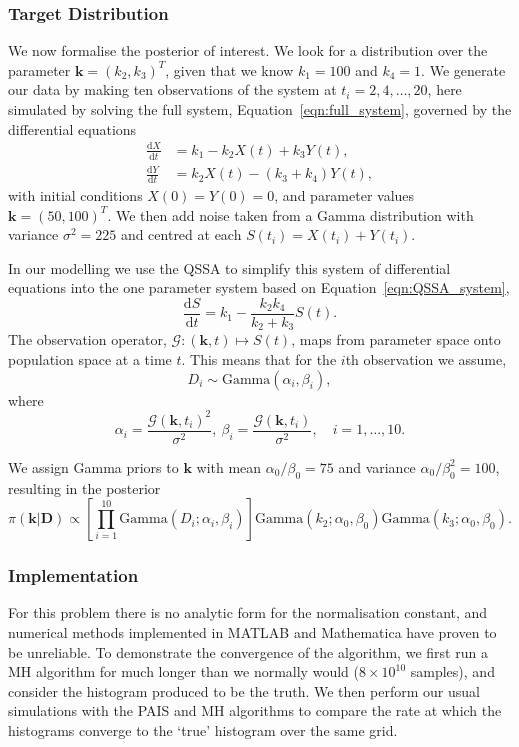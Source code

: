 \documentclass[final]{siamltex}
\begin{document}
\subsubsection{Target Distribution}

We now formalise the posterior of interest. We look for a distribution over the parameter $\mathbf{k} = (k_2, k_3)^T$, given that we know $k_1 = 100$ and $k_4=1$. We generate our data by making ten observations of the system at $t_i = 2, 4, \dots, 20$, here simulated by solving the full system, Equation~\ref{eqn:full_system}, governed by the differential equations
\begin{align*}
	\frac{\text{d}X}{\text{d}t} &= k_1 - k_2X(t)+k_3Y(t), \\
	\frac{\text{d}Y}{\text{d}t} &= k_2X(t) - (k_3+k_4)Y(t),
\end{align*}
with initial conditions $X(0)=Y(0) = 0$, and parameter values $\mathbf{k} = (50, 100)^T$. We then add noise taken from a Gamma distribution with variance $\sigma^2 = 225$ and centred at each $S(t_i)=X(t_i)+Y(t_i)$.

In our modelling we use the QSSA to simplify this system of differential equations into the one parameter system based on Equation~\ref{eqn:QSSA_system},
\[
	\frac{\text{d}S}{\text{d}t} = k_1 - \frac{k_2k_4}{k_2+k_3}S(t).
\]
The observation operator, $\mathcal{G}: (\mathbf{k},t) \mapsto S(t)$, maps from parameter space onto population space at a time $t$. This means that for the $i$th observation we assume,
\[
	 D_i \sim \text{Gamma}(\alpha_i, \beta_i),
\]
where
\[
	 \alpha_i = \frac{\mathcal{G}(\mathbf{k}, t_i)^2}{\sigma^2},\  \beta_i = \frac{\mathcal{G}(\mathbf{k}, t_i)}{\sigma^2}, \quad i = 1, \dots, 10.
\]

We assign Gamma priors to $\mathbf{k}$ with mean $\alpha_0/\beta_0 = 75$ and variance $\alpha_0/\beta_0^2 = 100$, resulting in the posterior
\[
	\pi(\mathbf{k}|\mathbf{D}) \propto \left[\prod\limits_{i=1}^{10} \text{Gamma}(D_i; \alpha_i, \beta_i)\right]\text{Gamma}(k_2; \alpha_0, \beta_0)\text{Gamma}(k_3; \alpha_0, \beta_0).
\]

\subsubsection{Implementation}\label{sec:chem_implementation}
For this problem there is no analytic form for the normalisation constant, and numerical methods implemented in MATLAB and Mathematica have proven to be unreliable. To demonstrate the convergence of the algorithm, we first run a MH algorithm for much longer than we normally would ($8\times 10^{10}$ samples), and consider the histogram produced to be the truth. We then perform our usual simulations with the PAIS and MH algorithms to compare the rate at which the histograms converge to the `true' histogram over the same grid.
\end{document}
